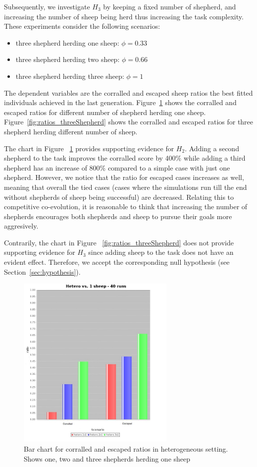 \documentclass[conference]{IEEEtran}
\begin{document}
Subsequently, we investigate $H_3$ by keeping a fixed number of shepherd, and increasing the number of sheep being herd thus increasing the task complexity. These experiments consider the following scenarios:
\begin{itemize}
	\item three shepherd herding one sheep: $\phi = 0.33$
	\item three shepherd herding two sheep: $\phi = 0.66$
	\item three shepherd herding three sheep: $\phi = 1$
\end{itemize}

The dependent variables are the corralled and escaped sheep ratios the best fitted individuals achieved in the last generation.
Figure~\ref{fig:ratios_oneSheep} shows the corralled and escaped ratios for different number of shepherd herding one sheep. Figure~\ref{fig:ratios_threeShepherd} shows the corralled and escaped ratios for three shepherd herding different number of sheep. 

The chart in Figure ~\ref{fig:ratios_oneSheep} provides supporting evidence for $H_2$. Adding a second shepherd to the task improves the corralled score by 400\% while adding a third shepherd has an increase of 800\% compared to a simple case with just one shepherd. 
However, we notice that the ratio for escaped cases increases as well, meaning that overall the tied cases (cases where the simulations run till the end without shepherds of sheep being successful) are decreased. 
Relating this to competitive co-evolution, it is reasonable to think that increasing the number of shepherds encourages both shepherds and sheep to pursue their goals more aggresively.

Contrarily, the chart in Figure ~\ref{fig:ratios_threeShepherd} does not provide supporting evidence for $H_3$ since adding sheep to the task does not have an evident effect. Therefore, we accept the corresponding null hypothesis (see Section~\ref{sec:hypothesis}). 

\begin{figure}[ht]
	\centering
	\includegraphics[width=3in]{imgs/hetero_1v1-hetero_2v1-hetero_3v1-ratio-bar.jpg}
	\caption{Bar chart for corralled and escaped ratios in heterogeneous setting. Shows one, two and three shepherds herding one sheep}
	\label{fig:ratios_oneSheep}
\end{figure}
\end{document}
